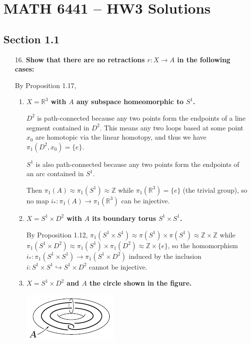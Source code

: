 \documentclass[a4paper,12pt]{article}
\newcommand{\iso}{\approx}
\begin{document}
\section*{MATH 6441 -- HW3 Solutions}
\subsection*{Section 1.1}
\begin{enumerate}
    \item[16.]
        \boldmath\textbf{Show that there are no retractions $r : X \to A$ in the following cases:
        }\unboldmath \par
        By Proposition 1.17,
        \begin{enumerate}[label=(\alph*)]
            \item
                \boldmath\textbf{$X = \mathbb{R}^3$ with $A$ any subspace homeomorphic to $S^1$.
                }\unboldmath \par
                $D^2$ is path-connected because any two points form the endpoints of a line segment contained in $D^2$. This means any two loops based at some point $x_0$ are homotopic via the linear homotopy, and thus we have $\pi_1(D^2, x_0) = \{e\}$. \par
                $S^1$ is also path-connected because any two points form the endpoints of an arc contained in $S^1$. \par
                Then $\pi_1(A) \iso \pi_1(S^1) \iso \mathbb{Z}$ while $\pi_1(\mathbb{R}^3) = \{e\}$ (the trivial group), so no map $i_* : \pi_1(A) \to \pi_1(\mathbb{R}^3)$ can be injective.
            \item
                \boldmath\textbf{$X = S^1 \times D^2$ with $A$ its boundary torus $S^1 \times S^1$.
                }\unboldmath \par
                By Proposition 1.12, $\pi_1(S^1 \times S^1) \iso \pi(S^1) \times \pi(S^1) \iso \mathbb{Z} \times \mathbb{Z}$ while $\pi_1(S^1 \times D^2) \iso \pi_1(S^1) \times \pi_1(D^2) \iso \mathbb{Z} \times \{e\}$, so the homomorphism $i_* : \pi_1(S^1 \times S^1) \to \pi_1(S^1 \times D^2)$ induced by the inclusion $i : S^1 \times S^1 \hookrightarrow S^1 \times D^2$ cannot be injective.
            \item
                \boldmath\textbf{$X = S^1 \times D^2$ and $A$ the circle shown in the figure.
                }\unboldmath \par
                \includegraphics[scale=1]{hw3_16} \par

\end{enumerate}
\end{enumerate}
\end{document}
